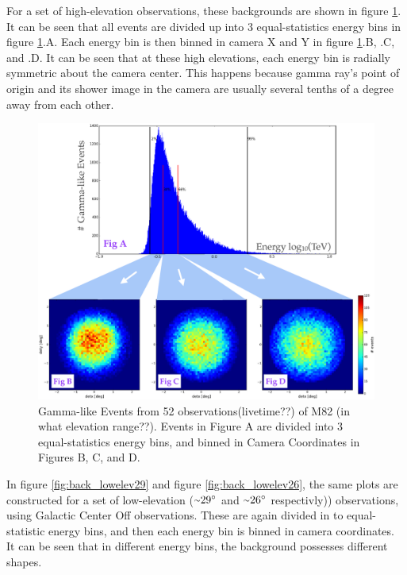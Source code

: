 For a set of high-elevation observations, these backgrounds are shown in figure \ref{fig:back_highelev}.
It can be seen that all events are divided up into 3 equal-statistics energy bins in figure \ref{fig:back_highelev}.A.
Each energy bin is then binned in camera X and Y in figure \ref{fig:back_highelev}.B, .C, and .D.
It can be seen that at these high elevations, each energy bin is radially symmetric about the camera center.
This happens because gamma ray's point of origin and its shower image in the camera are usually several tenths of a degree away from each other.

\begin{figure}[ht]
  \begin{center}
    \includegraphics[width=\textwidth]{images/ctools/backgrounds_highelev.eps}
    \caption[FITS Background at High Elevations]{Gamma-like Events from 52 observations(livetime??) of M82 (in what elevation range??).  Events in Figure A are divided into 3 equal-statistics energy bins, and binned in Camera Coordinates in Figures B, C, and D.}\label{fig:back_highelev}
  \end{center}
\end{figure}


In figure \ref{fig:back_lowelev29} and figure \ref{fig:back_lowelev26}, the same plots are constructed for a set of low-elevation ($ \nicetilde \ang{29} $ and $ \nicetilde \ang{26} $ respectivly)) observations, using Galactic Center Off observations.
These are again divided in to equal-statistic energy bins, and then each energy bin is binned in camera coordinates.
It can be seen that in different energy bins, the background possesses different shapes.

